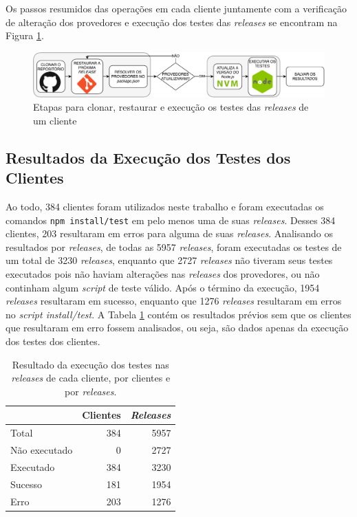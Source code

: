 Os passos resumidos das operações em cada cliente juntamente com a verificação de alteração dos provedores e execução dos testes das \textit{releases} se encontram na Figura \ref{fig:steps_work}.

\begin{figure}
    \centering
    \includegraphics[scale=0.7]{figuras/steps_work.pdf}
    \caption{Etapas para clonar, restaurar e execução os testes das \textit{releases} de um cliente}
    \label{fig:steps_work}
\end{figure}{}

\subsection{Resultados da Execução dos Testes dos Clientes}
\label{sec:col_dados}

Ao todo, 384 clientes foram utilizados neste trabalho e foram executadas os comandos \texttt{npm install/test} em pelo menos uma de suas \textit{releases}. Desses 384 clientes, 203 resultaram em erros para alguma de suas \textit{releases}. Analisando os resultados por \textit{releases}, de todas as 5957 \textit{releases}, foram executadas os testes de um total de 3230 \textit{releases}, enquanto que 2727 \textit{releases} não tiveram seus testes executados pois não haviam alterações nas \textit{releases} dos provedores, ou não continham algum \textit{script} de teste válido. Após o término da execução, 1954 \textit{releases} resultaram em sucesso, enquanto que 1276 \textit{releases} resultaram em erros no \textit{script install/test}. A Tabela \ref{tab:res_rq1_1} contém os resultados prévios sem que os clientes que resultaram em erro fossem analisados, ou seja, são dados apenas da execução dos testes dos clientes.

\begin{table}[]
\centering
\begin{tabular}{lrr}
\toprule
                    & Clientes & \textit{Releases} \\ \hline
    Total           & 384     & 5957     \\
    Não executado   & 0       & 2727     \\
    Executado       & 384     & 3230     \\
    Sucesso         & 181     & 1954     \\
    Erro            & 203     & 1276     \\ \bottomrule
\end{tabular}

\caption{Resultado da execução dos testes nas \textit{releases} de cada cliente, por clientes e por \textit{releases}.}
\label{tab:res_rq1_1}
\end{table}


